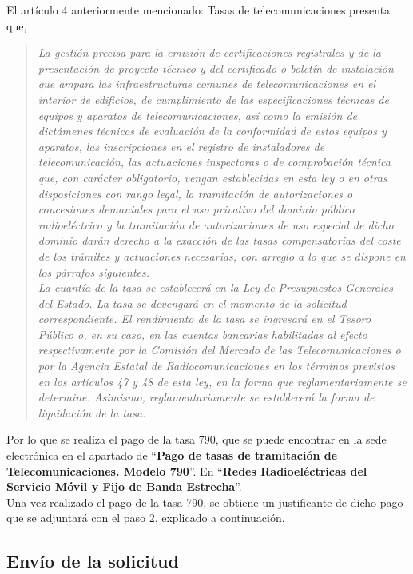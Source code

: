 El artículo 4 anteriormente mencionado: Tasas de telecomunicaciones presenta que,\\
\begin{quote}
\itshape
La gestión precisa para la emisión de certificaciones registrales y de la presentación de proyecto técnico y del certificado o boletín de instalación que ampara las infraestructuras comunes de telecomunicaciones en el interior de edificios, de cumplimiento de las especificaciones técnicas de equipos y aparatos de telecomunicaciones, así como la emisión de dictámenes técnicos de evaluación de la conformidad de estos equipos y aparatos, las inscripciones en el registro de instaladores de telecomunicación, las actuaciones inspectoras o de comprobación técnica que, con carácter obligatorio, vengan establecidas en esta ley o en otras disposiciones con rango legal, la tramitación de autorizaciones o concesiones demaniales para el uso privativo del dominio público radioeléctrico y la tramitación de autorizaciones de uso especial de dicho dominio darán derecho a la exacción de las tasas compensatorias del coste de los trámites y actuaciones necesarias, con arreglo a lo que se dispone en los párrafos siguientes.\\

La cuantía de la tasa se establecerá en la Ley de Presupuestos Generales del Estado. La tasa se devengará en el momento de la solicitud correspondiente. El rendimiento de la tasa se ingresará en el Tesoro Público o, en su caso, en las cuentas bancarias habilitadas al efecto respectivamente por la Comisión del Mercado de las Telecomunicaciones o por la Agencia Estatal de Radiocomunicaciones en los términos previstos en los artículos 47 y 48 de esta ley, en la forma que reglamentariamente se determine. Asimismo, reglamentariamente se establecerá la forma de liquidación de la tasa.
\end{quote}

Por lo que se realiza el pago de la tasa 790, que se puede encontrar en la sede electrónica en el apartado de “\textbf{Pago de tasas de tramitación de Telecomunicaciones. Modelo 790}”. En “\textbf{Redes Radioeléctricas del Servicio Móvil y Fijo de Banda Estrecha}”.\\

Una vez realizado el pago de la tasa 790, se obtiene un justificante de dicho pago que se adjuntará con el paso 2, explicado a continuación.

\subsection{Envío de la solicitud}


